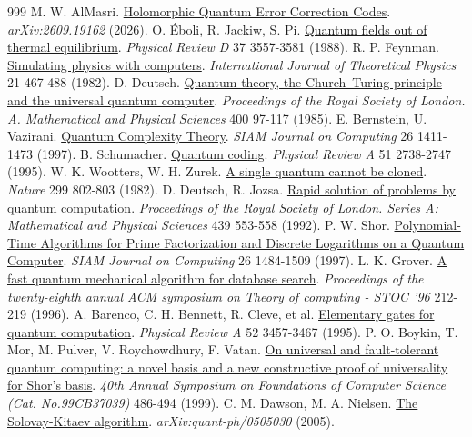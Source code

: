 \begin{thebibliography}{999}
 M. W. AlMasri. \href{https://arxiv.org/abs/2609.19162}{Holomorphic Quantum Error Correction Codes}. \emph{arXiv:2609.19162}  (2026).
 O. Éboli, R. Jackiw, S. Pi. \href{https://doi.org/10.1103/PhysRevD.37.3557}{Quantum fields out of thermal equilibrium}. \emph{Physical Review D} 37 3557-3581 (1988).
 R. P. Feynman. \href{https://doi.org/10.1007/BF02650179}{Simulating physics with computers}. \emph{International Journal of Theoretical Physics} 21 467-488 (1982).
 D. Deutsch. \href{https://doi.org/10.1098/rspa.1985.0070}{Quantum theory, the Church--Turing principle and the universal quantum computer}. \emph{Proceedings of the Royal Society of London. A. Mathematical and Physical Sciences} 400 97-117 (1985).
 E. Bernstein, U. Vazirani. \href{https://doi.org/10.1137/S0097539796300921}{Quantum Complexity Theory}. \emph{SIAM Journal on Computing} 26 1411-1473 (1997).
 B. Schumacher. \href{https://doi.org/10.1103/PhysRevA.51.2738}{Quantum coding}. \emph{Physical Review A} 51 2738-2747 (1995).
 W. K. Wootters, W. H. Zurek. \href{https://doi.org/10.1038/299802a0}{A single quantum cannot be cloned}. \emph{Nature} 299 802-803 (1982).
 D. Deutsch, R. Jozsa. \href{https://doi.org/10.1098/rspa.1992.0167}{Rapid solution of problems by quantum computation}. \emph{Proceedings of the Royal Society of London. Series A: Mathematical and Physical Sciences} 439 553-558 (1992).
 P. W. Shor. \href{https://doi.org/10.1137/S0097539795293172}{Polynomial-Time Algorithms for Prime Factorization and Discrete Logarithms on a Quantum Computer}. \emph{SIAM Journal on Computing} 26 1484-1509 (1997).
 L. K. Grover. \href{https://doi.org/10.1145/237814.237866}{A fast quantum mechanical algorithm for database search}. \emph{Proceedings of the twenty-eighth annual ACM symposium on Theory of computing - STOC '96} 212-219 (1996).
 A. Barenco, C. H. Bennett, R. Cleve, et al. \href{https://doi.org/10.1103/PhysRevA.52.3457}{Elementary gates for quantum computation}. \emph{Physical Review A} 52 3457-3467 (1995).
 P. O. Boykin, T. Mor, M. Pulver, V. Roychowdhury, F. Vatan. \href{https://doi.org/10.1109/SFFCS.1999.814621}{On universal and fault-tolerant quantum computing: a novel basis and a new constructive proof of universality for Shor's basis}. \emph{40th Annual Symposium on Foundations of Computer Science (Cat. No.99CB37039)} 486-494 (1999).
 C. M. Dawson, M. A. Nielsen. \href{https://arxiv.org/abs/quant-ph/0505030}{The Solovay-Kitaev algorithm}. \emph{arXiv:quant-ph/0505030}  (2005).

\end{thebibliography}
